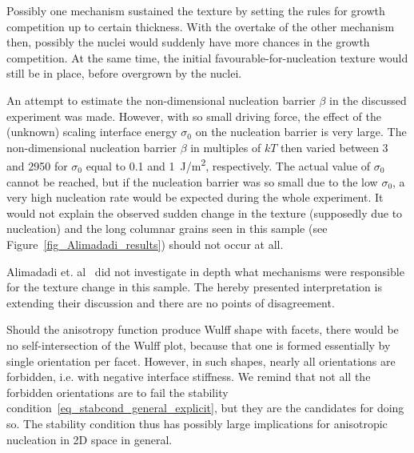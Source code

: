 	Possibly one mechanism sustained the texture by setting the rules for growth competition up to certain thickness. With the overtake of the other mechanism then, possibly the nuclei would suddenly have more chances in the growth competition. At the same time, the initial favourable-for-nucleation texture would still be in place, before overgrown by the nuclei.
	
	An attempt to estimate the non-dimensional nucleation barrier $\beta$ in the discussed experiment was made. 
	However, with so small driving force, the effect of the (unknown) scaling interface energy $\sigma_0$ on the nucleation barrier is very large. The non-dimensional nucleation barrier $\beta$ in multiples of $kT$ then varied between 3 and 2950 for $\sigma_0$ equal to 0.1 and \qty{1}{\J/\m^2}, respectively. The actual value of $\sigma_0$ cannot be reached, but if the nucleation barrier was so small due to the low $\sigma_0$, a very high nucleation rate would be expected during the whole experiment. It would not explain the observed sudden change in the texture (supposedly due to nucleation) and the long columnar grains seen in this sample (see Figure~\ref{fig_Alimadadi_results}) should not occur at all.
	
	Alimadadi et. al~\cite{Alimadadi2016} did not investigate in depth what mechanisms were responsible for the texture change in this sample. The hereby presented interpretation is extending their discussion and there are no points of disagreement.
	
	Should the anisotropy function produce Wulff shape with facets, there would be no self-intersection of the Wulff plot, because that one is formed essentially by single orientation per facet. However, in such shapes, nearly all orientations are forbidden, i.e. with negative interface stiffness. We remind that not all the forbidden orientations are to fail the stability condition~\eqref{eq_stabcond_general_explicit}, but they are the candidates for doing so. The stability condition thus has possibly large implications for anisotropic nucleation in 2D space in general.  

